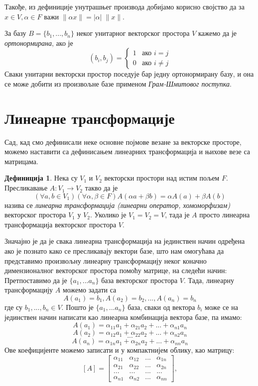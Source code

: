 \documentclass{report}
\theoremstyle{plain}
\theoremstyle{definition}
\newtheorem*{defn}{Дефиниција}
\begin{document}
Такође, из дефиниције унутрашњег производа добијамо корисно својство да за $x\in V, \alpha \in F$ важи $\|\alpha x\| = |\alpha|\; \|x\|$.

За базу $B=\{b_1, ..., b_n\}$ неког унитарног векторског простора $V$ кажемо да је \emph{ортонормирана}, ако је
$$(b_i, b_j) = \begin{cases}
                1 & \mbox{ако } i=j \\
                0 & \mbox{ако } i\neq j
               \end{cases}$$
Сваки унитарни векторски простор поседује бар једну ортонормирану базу, и она се може добити из произвољне базе применом \emph{Грам-Шмитовог поступка}\cite{milic}.

\section{Линеарне трансформације}
Сад, кад смо дефинисали неке основне појмове везане за векторске просторе, можемо наставити са дефинисањем линеарних трансформација и њихове везе са матрицама.
\begin{defn}
Нека су $V_1$ и $V_2$ векторски простори над истим пољем $F$. Пресликавање $A: V_1\to V_2$ такво да је
$$(\forall a, b\in V_1)(\forall \alpha, \beta \in F) A(\alpha a+ \beta b) = \alpha A(a) + \beta A(b)$$
назива се \emph{линеарна трансформација (линеарни оператор, хомоморфизам)} векторског простора $V_1$ у $V_2$. Уколико је $V_1 = V_2 = V$, тада је $A$ просто линеарна трансформација векторског простора $V$.
\end{defn}
Значајно је да је свака линеарна трансформација на јединствен начин одређена ако је познато како се пресликавају вектори базе, што нам омогућава да представимо произвољну линеарну трансформацију неког коначно димензионалног векторског простора помоћу матрице, на следећи начин:\\
Претпоставимо да је $\{a_1, ...a_n\}$ база векторског простора $V$. Тада, линеарну трансформацију $A$ можемо задати са
$$A(a_1) = b_1, A(a_2) = b_2, ..., A(a_n) = b_n$$
где су $b_1, ..., b_n\in V$. Пошто је $\{a_1, ...a_n\}$ база, сваки од вектора $b_i$ може се на јединствен начин написати као линеарна комбинација вектора базе, па имамо:
$$A(a_1) = \alpha_{11}a_1 + \alpha_{21}a_2 + ... + \alpha_{n1}a_n$$
$$A(a_2) = \alpha_{12}a_1 + \alpha_{22}a_2 + ... + \alpha_{n2}a_n$$
$$...$$
$$A(a_n) = \alpha_{1n}a_1 + \alpha_{2n}a_2 + ... + \alpha_{nn}a_n$$
Ове коефицијенте можемо записати и у компактнијем облику, као матрицу:
$$[A] = \begin{bmatrix}
    \alpha_{11} & \alpha_{12} & ... & \alpha_{1n} \\
    \alpha_{21} & \alpha_{22} & ... & \alpha_{2n} \\
    ... & ... & ... & ... \\
    \alpha_{n1} & \alpha_{n2} & ... & \alpha_{nn}
  \end{bmatrix},$$
\end{document}

